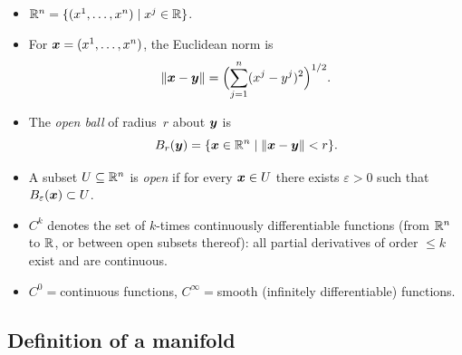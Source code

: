 \begin{itemize}
  \item $\mathbb{R}^{n} = \{(x^1,\dots,x^n) \mid x^j \in \mathbb{R}\}$.
  \item For $\boldsymbol{x} = (x^1,\dots,x^n)$, the Euclidean norm is
    \[
      \lVert \boldsymbol{x}-\boldsymbol{y} \rVert
        = \Bigl(\sum_{j=1}^{n}(x^j - y^j)^2\Bigr)^{1/2}.
    \]
  \item The \emph{open ball} of radius~$r$ about $\boldsymbol{y}$ is
    \[
      B_r(\boldsymbol{y})
        = \{\boldsymbol{x}\in\mathbb{R}^{n} \mid \lVert \boldsymbol{x}-\boldsymbol{y} \rVert < r\}.
    \]
  \item A subset $U\subseteq\mathbb{R}^{n}$ is \emph{open} if
    for every $\boldsymbol{x}\in U$ there exists $\varepsilon > 0$ such that
    $B_\varepsilon(\boldsymbol{x})\subset U$.
  \item $C^k$ denotes the set of $k$-times continuously differentiable
    functions (from $\mathbb{R}^{n}$ to $\mathbb{R}$, or between open subsets thereof):
    all partial derivatives of order $\le k$ exist and are continuous.
  \item $C^0 = {}$continuous functions,\quad
    $C^\infty = {}$smooth (infinitely differentiable) functions.
\end{itemize}

\subsection{Definition of a manifold}\label{sec:manifold-def}

